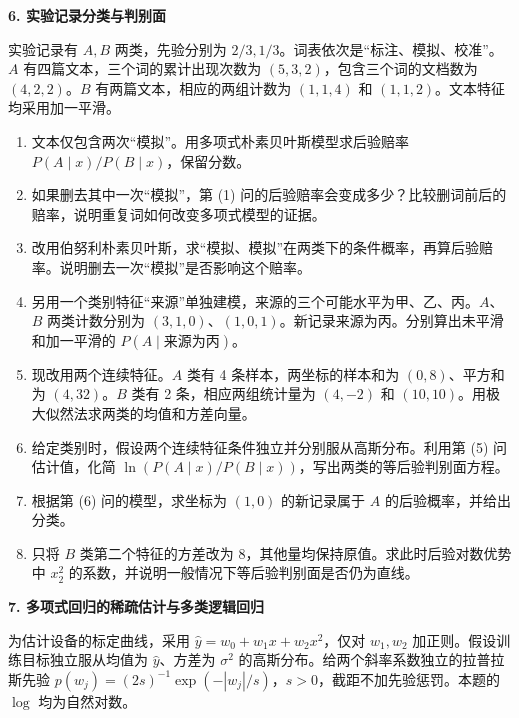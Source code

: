 \noindent\textbf{6. 实验记录分类与判别面}

实验记录有 $A,B$ 两类，先验分别为 $2/3,1/3$。词表依次是“标注、模拟、校准”。$A$ 有四篇文本，三个词的累计出现次数为 $(5,3,2)$，包含三个词的文档数为 $(4,2,2)$。$B$ 有两篇文本，相应的两组计数为 $(1,1,4)$ 和 $(1,1,2)$。文本特征均采用加一平滑。
\begin{enumerate}[label=(\arabic*)]
\item 文本仅包含两次“模拟”。用多项式朴素贝叶斯模型求后验赔率 $P(A\mid x)/P(B\mid x)$，保留分数。
\item 如果删去其中一次“模拟”，第 (1) 问的后验赔率会变成多少？比较删词前后的赔率，说明重复词如何改变多项式模型的证据。
\item 改用伯努利朴素贝叶斯，求“模拟、模拟”在两类下的条件概率，再算后验赔率。说明删去一次“模拟”是否影响这个赔率。
\item 另用一个类别特征“来源”单独建模，来源的三个可能水平为甲、乙、丙。$A$、$B$ 两类计数分别为 $(3,1,0)$、$(1,0,1)$。新记录来源为丙。分别算出未平滑和加一平滑的 $P(A\mid\text{来源为丙})$。
\item 现改用两个连续特征。$A$ 类有 4 条样本，两坐标的样本和为 $(0,8)$、平方和为 $(4,32)$。$B$ 类有 2 条，相应两组统计量为 $(4,-2)$ 和 $(10,10)$。用极大似然法求两类的均值和方差向量。
\item 给定类别时，假设两个连续特征条件独立并分别服从高斯分布。利用第 (5) 问估计值，化简 $\ln(P(A\mid x)/P(B\mid x))$，写出两类的等后验判别面方程。
\item 根据第 (6) 问的模型，求坐标为 $(1,0)$ 的新记录属于 $A$ 的后验概率，并给出分类。
\item 只将 $B$ 类第二个特征的方差改为 8，其他量均保持原值。求此时后验对数优势中 $x_2^2$ 的系数，并说明一般情况下等后验判别面是否仍为直线。
\end{enumerate}

\noindent\textbf{7. 多项式回归的稀疏估计与多类逻辑回归}

为估计设备的标定曲线，采用 $\hat y=w_0+w_1x+w_2x^2$，仅对 $w_1,w_2$ 加正则。假设训练目标独立服从均值为 $\hat y$、方差为 $\sigma^2$ 的高斯分布。给两个斜率系数独立的拉普拉斯先验 $p(w_j)=(2s)^{-1}\exp(-|w_j|/s)$，$s>0$，截距不加先验惩罚。本题的 $\log$ 均为自然对数。

